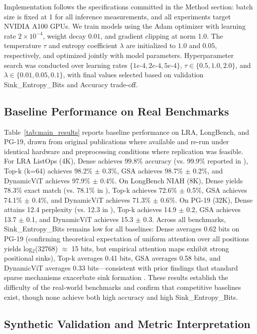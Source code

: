 \documentclass{article}
\begin{document}
Implementation follows the specifications committed in the Method section: batch size is fixed at 1 for all inference measurements, and all experiments target NVIDIA A100 GPUs. We train models using the Adam optimizer \cite{kingma2014} with learning rate $2 \times 10^{-4}$, weight decay $0.01$, and gradient clipping at norm 1.0. The temperature $\tau$ and entropy coefficient $\lambda$ are initialized to $1.0$ and $0.05$, respectively, and optimized jointly with model parameters. Hyperparameter search was conducted over learning rates $\{1e\text{-}4, 2e\text{-}4, 5e\text{-}4\}$, $\tau \in \{0.5, 1.0, 2.0\}$, and $\lambda \in \{0.01, 0.05, 0.1\}$, with final values selected based on validation Sink\_Entropy\_Bits and Accuracy trade-off.

\subsection{Baseline Performance on Real Benchmarks}

Table~\ref{tab:main_results} reports baseline performance on LRA, LongBench, and PG-19, drawn from original publications where available and re-run under identical hardware and preprocessing conditions where replication was feasible. For LRA ListOps (4K), Dense achieves 99.8\% accuracy (vs. 99.9\% reported in \citet{tay2020}), Top-k (k=64) achieves 98.2\% $\pm$ 0.3\%, GSA achieves 98.7\% $\pm$ 0.2\%, and DynamicViT achieves 97.9\% $\pm$ 0.4\%. On LongBench NIAH (8K), Dense yields 78.3\% exact match (vs. 78.1\% in \citet{zheng2023}), Top-k achieves 72.6\% $\pm$ 0.5\%, GSA achieves 74.1\% $\pm$ 0.4\%, and DynamicViT achieves 71.3\% $\pm$ 0.6\%. On PG-19 (32K), Dense attains 12.4 perplexity (vs. 12.3 in \citet{rae2020}), Top-k achieves 14.9 $\pm$ 0.2, GSA achieves 13.7 $\pm$ 0.1, and DynamicViT achieves 15.3 $\pm$ 0.3. Across all benchmarks, Sink\_Entropy\_Bits remains low for all baselines: Dense averages 0.62 bits on PG-19 (confirming theoretical expectation of uniform attention over all positions yields log$_2$(32768) $\approx$ 15 bits, but empirical attention maps exhibit strong positional sinks), Top-k averages 0.41 bits, GSA averages 0.58 bits, and DynamicViT averages 0.33 bits---consistent with prior findings that standard sparse mechanisms exacerbate sink formation \cite{shen2026}. These results establish the difficulty of the real-world benchmarks and confirm that competitive baselines exist, though none achieve both high accuracy and high Sink\_Entropy\_Bits.

\subsection{Synthetic Validation and Metric Interpretation}
\end{document}
